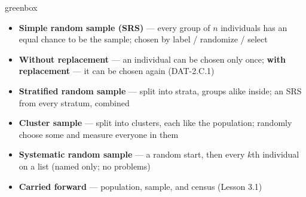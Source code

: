 \documentclass[10pt]{article}
\begin{document}
\boxguard
\begin{skillbox}{greenbox}
\begin{minipage}[t]{0.48\linewidth}
    \begin{itemize}
        \item \textbf{Simple random sample (SRS)} --- every group of $n$ individuals has an equal
              chance to be the sample; chosen by label / randomize / select
        \item \textbf{Without replacement} --- an individual can be chosen only once;
              \textbf{with replacement} --- it can be chosen again (DAT-2.C.1)
        \item \textbf{Stratified random sample} --- split into strata, groups alike inside; an
              SRS from every stratum, combined
    \end{itemize}
\end{minipage}
\hfill
\begin{minipage}[t]{0.48\linewidth}
    \begin{itemize}
        \item \textbf{Cluster sample} --- split into clusters, each like the population;
              randomly choose some and measure everyone in them
        \item \textbf{Systematic random sample} --- a random start, then every $k$th individual
              on a list (named only; no problems)
        \item \textbf{Carried forward} --- population, sample, and census (Lesson 3.1)
    \end{itemize}
\end{minipage}
\end{skillbox}
\end{document}
